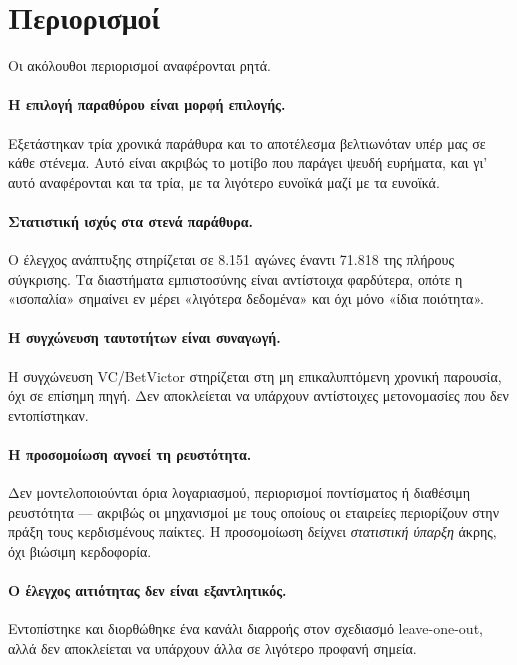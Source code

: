 \documentclass[12pt,a4paper,oneside]{report}
\renewcommand{\_}{\oldunderscore\allowbreak}
\theoremstyle{definition}
\theoremstyle{plain}
\theoremstyle{remark}
\begin{document}
\section{Περιορισμοί}
\label{sec:limits}

Οι ακόλουθοι περιορισμοί αναφέρονται ρητά.

\paragraph{Η επιλογή παραθύρου είναι μορφή επιλογής.} Εξετάστηκαν τρία χρονικά παράθυρα και
το αποτέλεσμα βελτιωνόταν υπέρ μας σε κάθε στένεμα. Αυτό είναι ακριβώς το μοτίβο που παράγει
ψευδή ευρήματα, και γι' αυτό αναφέρονται και τα τρία, με τα λιγότερο ευνοϊκά μαζί με τα
ευνοϊκά.

\paragraph{Στατιστική ισχύς στα στενά παράθυρα.} Ο έλεγχος ανάπτυξης στηρίζεται σε 8.151
αγώνες έναντι 71.818 της πλήρους σύγκρισης. Τα διαστήματα εμπιστοσύνης είναι αντίστοιχα
φαρδύτερα, οπότε η «ισοπαλία» σημαίνει εν μέρει «λιγότερα δεδομένα» και όχι μόνο «ίδια
ποιότητα».

\paragraph{Η συγχώνευση ταυτοτήτων είναι συναγωγή.} Η συγχώνευση VC/BetVictor στηρίζεται στη
μη επικαλυπτόμενη χρονική παρουσία, όχι σε επίσημη πηγή. Δεν αποκλείεται να υπάρχουν
αντίστοιχες μετονομασίες που δεν εντοπίστηκαν.

\paragraph{Η προσομοίωση αγνοεί τη ρευστότητα.} Δεν μοντελοποιούνται όρια λογαριασμού,
περιορισμοί ποντίσματος ή διαθέσιμη ρευστότητα --- ακριβώς οι μηχανισμοί με τους οποίους οι
εταιρείες περιορίζουν στην πράξη τους κερδισμένους παίκτες. Η προσομοίωση δείχνει
\emph{στατιστική ύπαρξη} άκρης, όχι βιώσιμη κερδοφορία.

\paragraph{Ο έλεγχος αιτιότητας δεν είναι εξαντλητικός.} Εντοπίστηκε και διορθώθηκε ένα
κανάλι διαρροής στον σχεδιασμό leave-one-out, αλλά δεν αποκλείεται να υπάρχουν άλλα σε
λιγότερο προφανή σημεία.
\end{document}

